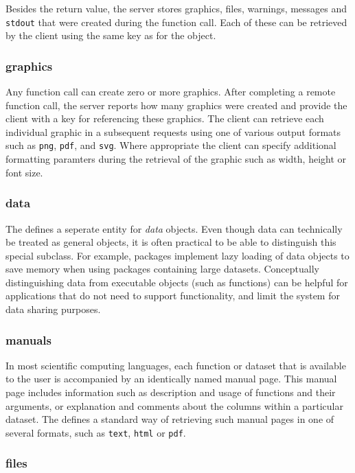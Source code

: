 Besides the return value, the server stores graphics, files, warnings, messages and \texttt{stdout} that were created during the function call. Each of these can be retrieved by the client using the same key as for the object.

\subsubsection{graphics}

Any function call can create zero or more graphics. After completing a remote function call, the server reports how many graphics were created and provide the client with a key for referencing these graphics. The client can retrieve each individual graphic in a subsequent requests using one of various output formats such as \texttt{png}, \texttt{pdf}, and \texttt{svg}. Where appropriate the client can specify additional formatting paramters during the retrieval of the graphic such as width, height or font size.

\subsubsection{data}

The \API defines a seperate entity for \emph{data} objects. Even though data can technically be treated as general objects, it is often practical to be able to distinguish this special subclass. For example, \R packages implement lazy loading of data objects to save memory when using packages containing large datasets. Conceptually distinguishing data from executable objects (such as functions) can be helpful for applications that do not need to support \RPC functionality, and limit the system for data sharing purposes.

\subsubsection{manuals}

In most scientific computing languages, each function or dataset that is available to the user is accompanied by an identically named manual page. This manual page includes information such as description and usage of functions and their arguments, or explanation and comments about the columns within a particular dataset. The \API defines a standard way of retrieving such manual pages in one of several formats, such as \texttt{text}, \texttt{html} or \texttt{pdf}.

\subsubsection{files}

